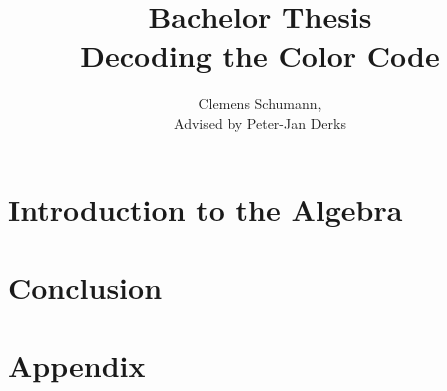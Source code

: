 \documentclass[12pt]{article}
\title{Bachelor Thesis\\ Decoding the Color Code}
\author{Clemens Schumann, \\
Advised by Peter-Jan Derks}
\begin{document}
\maketitle
\newpage
\tableofcontents
\newpage
%
\section{Introduction to the Algebra}

\newpage
\section{Conclusion}

\newpage
\section{Appendix}

\newpage
%
%
\end{document}
